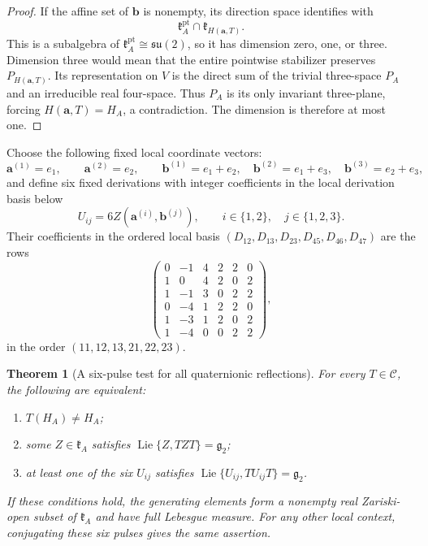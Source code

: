 \documentclass[11pt,a4paper]{article}
\newtheorem{theorem}{Theorem}[section]
\newcommand{\Lie}{\operatorname{Lie}}
\begin{document}
\begin{proof}
If the affine set of $\mathbf b$ is nonempty, its direction space identifies with
\[
\mathfrak k_A^{\mathrm{pt}}\cap\mathfrak k_{H(\mathbf a,T)}.
\]
This is a subalgebra of $\mathfrak k_A^{\mathrm{pt}}\cong\mathfrak{su}(2)$, so it has dimension zero, one, or three.  Dimension three would mean that the entire pointwise stabilizer preserves $P_{H(\mathbf a,T)}$.  Its representation on $V$ is the direct sum of the trivial three-space $P_A$ and an irreducible real four-space.  Thus $P_A$ is its only invariant three-plane, forcing $H(\mathbf a,T)=H_A$, a contradiction.  The dimension is therefore at most one.
\end{proof}

Choose the following fixed local coordinate vectors:
\[
\mathbf a^{(1)}=e_1,\qquad \mathbf a^{(2)}=e_2,\qquad
\mathbf b^{(1)}=e_1+e_2,\quad \mathbf b^{(2)}=e_1+e_3,\quad \mathbf b^{(3)}=e_2+e_3,
\]
and define six fixed derivations with integer coefficients in the local derivation basis below
\[
U_{ij}=6Z(\mathbf a^{(i)},\mathbf b^{(j)}),\qquad i\in\{1,2\},\quad j\in\{1,2,3\}.
\]
Their coefficients in the ordered local basis $(D_{12},D_{13},D_{23},D_{45},D_{46},D_{47})$ are the rows
\begin{equation}
\begin{pmatrix}
0&-1&4&2&2&0\\
1&0&4&2&0&2\\
1&-1&3&0&2&2\\
0&-4&1&2&2&0\\
1&-3&1&2&0&2\\
1&-4&0&0&2&2
\end{pmatrix},
\label{eq:six-universal-pulses}
\end{equation}
in the order $(11,12,13,21,22,23)$.  

\begin{theorem}[A six-pulse test for all quaternionic reflections]
\label{thm:universal-reflections}
For every $T\in\mathscr C$, the following are equivalent:
\begin{enumerate}[label=\textnormal{(\roman*)},leftmargin=9mm]
\item $T(H_A)\ne H_A$;
\item some $Z\in\mathfrak k_A$ satisfies $\Lie\{Z,TZT\}=\mathfrak g_2$;
\item at least one of the six $U_{ij}$ satisfies $\Lie\{U_{ij},TU_{ij}T\}=\mathfrak g_2$.
\end{enumerate}
If these conditions hold, the generating elements form a nonempty real Zariski-open subset of $\mathfrak k_A$ and have full Lebesgue measure.  For any other local context, conjugating these six pulses gives the same assertion.
\end{theorem}
\end{document}
